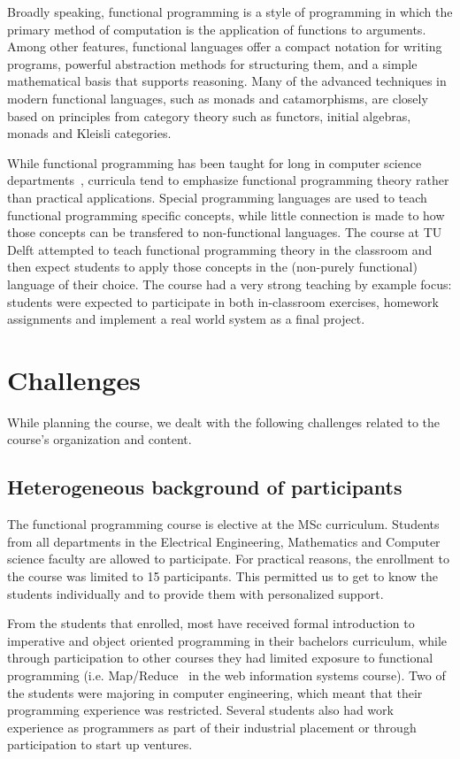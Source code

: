\documentclass[conference]{IEEEtran}
\begin{document}
Broadly speaking, functional programming is a style of programming in which the
primary method of computation is the application of functions to arguments.
Among other features, functional languages offer a compact notation for writing
programs, powerful abstraction methods for structuring them, and a simple
mathematical basis that supports reasoning. Many of the advanced techniques in
modern functional languages, such as monads and catamorphisms, are closely based
on principles from category theory such as functors, initial algebras, monads
and Kleisli categories.

While functional programming has been taught for long in computer science
departments~\cite{Joost93}, curricula tend to emphasize functional programming
theory rather than practical applications. Special programming languages are
used to teach functional programming specific concepts, while little connection
is made to how those concepts can be transfered to non-functional languages.
The course at TU Delft attempted to teach functional programming theory in the
classroom and then expect students to apply those concepts in the (non-purely
functional) language of their choice. The course had a very strong teaching by
example focus: students were expected to participate in both in-classroom
exercises, homework assignments and implement a real world system as a final
project.

\section{Challenges}

While planning the course, we dealt with the following challenges related
to the course's organization and content.

\subsection{Heterogeneous background of participants}

The functional programming course is elective at the MSc curriculum. Students
from all departments in the Electrical Engineering, Mathematics and Computer
science faculty are allowed to participate. For practical reasons, the
enrollment to the course was limited to 15 participants. This permitted
us to get to know the students individually and to provide them with
personalized support.

From the students that enrolled, most have received formal introduction to
imperative and object oriented programming in their bachelors curriculum, while
through participation to other courses they had limited exposure to functional
programming (i.e. Map/Reduce~\cite{Dean04} in the web information systems
course). Two of the students were majoring in computer engineering, which meant
that their programming experience was restricted. Several students also had work
experience as programmers as part of their industrial placement or through
participation to start up ventures.
\end{document}
